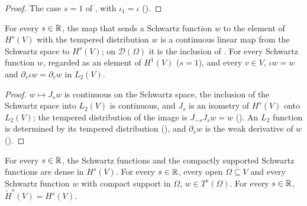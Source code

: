 \begin{proof}
\leanok
The case $s = 1$ of , with $\iota_1 = \iota$
().
\end{proof}

\begin{lemma}
\label{lem:sobolev-of-schwartz}
\leanok
{}
For every $s \in \mathbb{R}$, the map that sends a Schwartz function $w$ to the element of $H^s(V)$ with
the tempered distribution $w$ is a continuous linear map from the Schwartz space to $H^s(V)$; on
$\mathcal D(\Omega)$ it is the inclusion of . For every
Schwartz function $w$, regarded as an element of $H^1(V)$ ($s = 1$), and every $v \in V$,
$\iota w = w$ and $\partial_v \iota w = \partial_v w$ in $L_2(V)$.
\end{lemma}

\begin{proof}
\leanok
$w \mapsto J_s w$ is continuous on the Schwartz space, the inclusion of the Schwartz space into
$L_2(V)$ is continuous, and $J_s$ is an isometry of $H^s(V)$ onto $L_2(V)$; the tempered
distribution of the image is $J_{-s} J_s w = w$ (). An
$L_2$ function is determined by its tempered distribution (), and
$\partial_v w$ is the weak derivative of $w$ ().
\end{proof}

\begin{theorem}
\label{thm:sobolev-schwartz-dense}
\leanok
{}
For every $s \in \mathbb{R}$, the Schwartz functions and the compactly supported Schwartz functions are
dense in $H^s(V)$. For every $s \in \mathbb{R}$, every open $\Omega \subseteq V$ and every Schwartz
function $w$ with compact support in $\Omega$, $w \in T^s(\Omega)$. For every $s \in \mathbb{R}$,
$\tilde H^s(V) = H^s(V)$.
\end{theorem}

